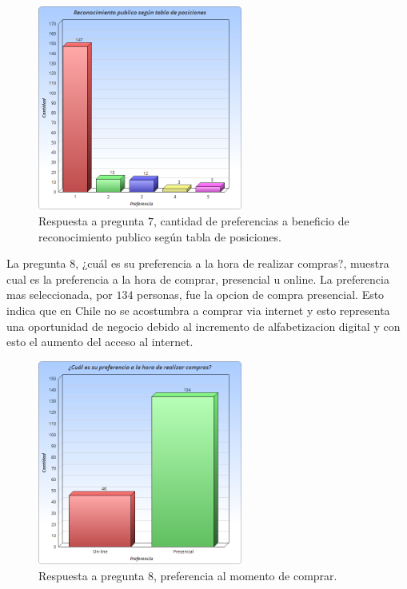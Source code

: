 \begin{figure}[!htb]
  \centering
  \includegraphics[width=0.6\textwidth]{images/Graficos/graf_5_8.png}
  \caption[chart5.8]{Respuesta a pregunta $7$, cantidad de preferencias a beneficio de reconocimiento 
publico según tabla de posiciones.}
  \label{fig:chart5.8}
\end{figure}


La pregunta $8$, ¿cuál es su preferencia a la hora de realizar compras?, muestra cual es la preferencia 
a la hora de comprar, presencial u online. La preferencia mas seleccionada, por $134$ personas, 
fue la opcion de compra presencial. Esto indica que en Chile no se acostumbra a comprar via internet 
y esto representa una oportunidad de negocio debido al incremento de alfabetizacion digital y 
con esto el aumento del acceso al internet.

\begin{figure}[!htb]
  \centering
  \includegraphics[width=0.6\textwidth]{images/Graficos/graf_5_9.png}
  \caption[chart5.9]{Respuesta a pregunta $8$, preferencia al momento de comprar.}
  \label{fig:chart5.9}
\end{figure}

